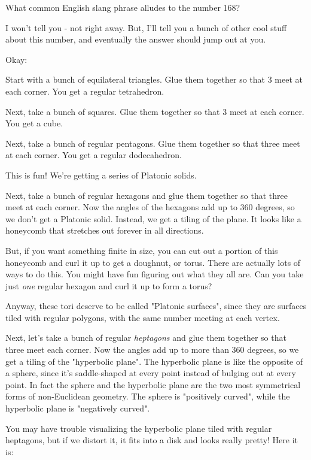 


What common English slang phrase alludes to the number 168?

I won't tell you - not right away.  But, I'll tell you a bunch of 
other cool stuff about this number, and eventually the answer should 
jump out at you. 

Okay:

Start with a bunch of equilateral triangles.  Glue them together
so that 3 meet at each corner.  You get a regular tetrahedron.

Next, take a bunch of squares.  Glue them together so that 3
meet at each corner.  You get a cube.

Next, take a bunch of regular pentagons.  Glue them together so 
that three meet at each corner.  You get a regular dodecahedron.

This is fun!  We're getting a series of Platonic solids.

Next, take a bunch of regular hexagons and glue them together 
so that three meet at each corner.  Now the angles of the hexagons 
add up to 360 degrees, so we don't get a Platonic solid.  Instead, we 
get a tiling of the plane.  It looks like a honeycomb that stretches 
out forever in all directions.

But, if you want something finite in size, you can cut out a portion 
of this honeycomb and curl it up to get a doughnut, or torus.  There 
are actually lots of ways to do this.  You might have fun figuring out 
what they all are.  Can you take just \emph{one} regular hexagon and curl 
it up to form a torus?

Anyway, these tori deserve to be called "Platonic surfaces", since
they are surfaces tiled with regular polygons, with the same number
meeting at each vertex.   

Next, let's take a bunch of regular \emph{heptagons} and glue them 
together so that three meet each corner.  Now the angles add up
to more than 360 degrees, so we get a tiling of the "hyperbolic
plane".  The hyperbolic plane is like the opposite of a sphere,  
since it's saddle-shaped at every point instead of bulging 
out at every point.  In fact the sphere and the hyperbolic plane
are the two most symmetrical forms of non-Euclidean geometry.  
The sphere is "positively curved", while the hyperbolic plane is 
"negatively curved".

You may have trouble visualizing the hyperbolic plane tiled with 
regular heptagons, but if we distort it, it fits into a disk and 
looks really pretty!  Here it is:

